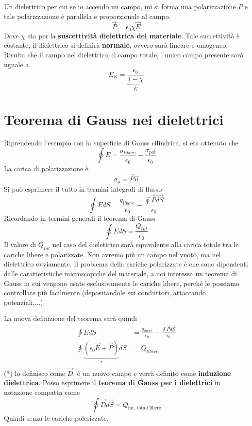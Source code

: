 \documentclass[a4paper, 12pt]{book}
\theoremstyle{plain}
\begin{document}
Un dielettrico per cui se io accendo un campo, mi si forma una polarizzazione $P$ e tale polarizzazione è parallela e 
proporzionale al campo.
\[
    \vec{P} = \epsilon_0 \chi \vec{E}
\]
Dove $\chi$ sta per la \textbf{suscettività dielettrica del materiale}. Tale suscettività è costante, il dielettrico si 
definirà \textbf{normale}, ovvero sarà lineare e omogeneo. Risulta che il campo nel dielettrico, il campo totale, l'unico campo presente 
sarà uguale a
\[
    E_K = \frac{\epsilon_0}{\underbrace{1 - \chi}_{K}}
\]

\section{Teorema di Gauss nei dielettrici}

Riprendendo l'esempio con la superficie di Gauss cilindrica, si era ottenuto che 
\[
    \oint E = \frac{\sigma_{libere}}{\epsilon_0} - \frac{\sigma_{pol}}{\epsilon_0}
\]
La carica di polarizzazione è 
\[
    \sigma_p = \vec{P} \vec{n}
\]
Si può esprimere il tutto in termini integrali di flusso 
\[
    \oint E dS = \frac{q_{libere}}{\epsilon_0} - \frac{\oint \vec{P} \vec{dS}}{\epsilon_0}
\]
Ricordando in termini generali il teorema di Gauss
\[
    \oint E dS = \frac{Q_{int}}{\epsilon_0}
\]
Il valore di $Q_{int}$ nel caso del dielettrico sarà equivalente alla carica totale tra le cariche libere e polarizzate. Non avremo più 
un campo nel vuoto, ma nel dielettrico ovviamente. Il problema della cariche polarizzate è che sono dipendenti dalle caratteristiche 
microscopiche del materiale, a noi interessa un teorema di Gauss in cui vengono usate esclusivamente le cariche libere, perché le possiamo 
controllare più facilmente (depositandole sui conduttori, attaccando potenziali,...).

La nuova definizione del teorema sarà quindi 
\[
    \begin{split}
        \oint E dS &= \frac{q_{libere}}{\epsilon_0} - \frac{\oint \vec{P} \vec{dS}}{\epsilon_0} \\
        \oint \underbrace{(\epsilon_0 \vec{E} + \vec{P})}_{*} dS &= Q_{libere} \\
    \end{split}
\]
(*) lo definisco come $\vec{D}$, è un nuovo campo e verrà definito come \textbf{induzione dielettrica}. Posso esprimere il \textbf{teorema 
di Gauss per i dielettrici} in notazione compatta come 
\[
    \oint \vec{D} \vec{dS} = Q_{\textrm{int. totali libere}}
\]
Quindi senza le cariche polerizzate. 
\end{document}
